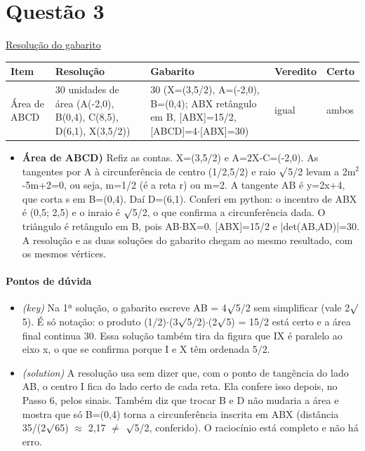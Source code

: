 \documentclass{article}%
\begin{document}
\section*{Questão 3}%
\href{https://poliedroresolve.sistemapoliedro.com.br/vestibulares/ita/2026/ita-2-fase-dia-1-28-10-2025-2-fase-dia-1/dissertativa-3-matematica-2-fase-dia-1-ita-2026}{Resolução do gabarito}\par\smallskip%
\begin{longtable}{@{}p{} p{} p{} p{} p{}@{}}\toprule Item & Resolução & Gabarito & Veredito & Certo \\ \midrule
Área de ABCD & 30 unidades de área (A({-}2,0), B(0,4), C(8,5), D(6,1), X(3,5/2)) & 30 (X=(3,5/2), A=({-}2,0), B=(0,4); ABX retângulo em B, {[}ABX{]}=15/2, {[}ABCD{]}=4$\cdot${[}ABX{]}=30) & igual & ambos \\
\bottomrule\end{longtable}%
\begin{itemize}%
\item%
\textbf{Área de ABCD)} Refiz as contas. X=(3,5/2) e A=2X-C=({-}2,0). As tangentes por A à circunferência de centro (1/2,5/2) e raio $\surd$5/2 levam a 2m$^2$-5m+2=0, ou seja, m=1/2 (é a reta r) ou m=2. A tangente AB é y=2x+4, que corta s em B=(0,4). Daí D=(6,1). Conferi em python: o incentro de ABX é (0,5; 2,5) e o inraio é $\surd$5/2, o que confirma a circunferência dada. O triângulo é retângulo em B, pois AB$\cdot$BX=0. {[}ABX{]}=15/2 e |det(AB,AD)|=30. A resolução e as duas soluções do gabarito chegam ao mesmo resultado, com os mesmos vértices.%
\end{itemize}%
\paragraph{Pontos de dúvida}%
\begin{itemize}%
\item%
\textit{(key)} Na 1ª solução, o gabarito escreve AB = 4$\surd$5/2 sem simplificar (vale 2$\surd$5). É só notação: o produto (1/2)$\cdot$(3$\surd$5/2)$\cdot$(2$\surd$5) = 15/2 está certo e a área final continua 30. Essa solução também tira da figura que IX é paralelo ao eixo x, o que se confirma porque I e X têm ordenada 5/2.%
\item%
\textit{(solution)} A resolução usa sem dizer que, com o ponto de tangência do lado AB, o centro I fica do lado certo de cada reta. Ela confere isso depois, no Passo 6, pelos sinais. Também diz que trocar B e D não mudaria a área e mostra que só B=(0,4) torna a circunferência inscrita em ABX (distância 35/(2$\surd$65) $\approx$ 2,17 $\neq$ $\surd$5/2, conferido). O raciocínio está completo e não há erro.%
\end{itemize}%
\end{document}
